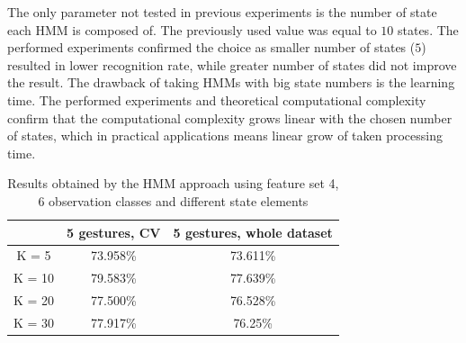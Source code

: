 The only parameter not tested in previous experiments is the number of state each HMM is composed of. 
The previously used value was equal to $10$ states.
The performed experiments confirmed the choice as smaller number of states ($5$) resulted in lower recognition rate, while greater number of states did not improve the result.
The drawback of taking HMMs with big state numbers is the learning time. 
The performed experiments and theoretical computational complexity confirm that the computational complexity grows linear with the chosen number of states, which in practical applications means linear grow of taken processing time.


\begin{table}[htp!]
	\label{tab:dyn3}
	\caption{Results obtained by the HMM approach using feature set 4, 6 observation classes and different state elements}
    \begin{tabular}{|c|c|c|}
    \hline
    ~                                 & 5 gestures, CV & 5 gestures, whole dataset  \\ \hline
	K = 5                  	  & 73.958\% & 73.611\%   \\ \hline
    K = 10                     & 79.583\% & 77.639\%   \\ \hline
    K = 20                    & 77.500\% & 76.528\%   \\ \hline
    K = 30                     & 77.917\% & 76.25\%   \\ \hline
    \end{tabular}
\end{table}

